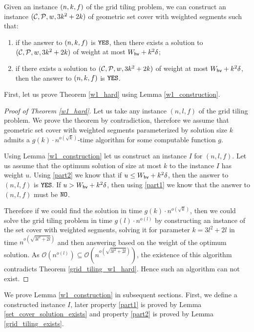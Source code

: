 \begin{lemma}
\label{w1_construction}
Given an instance $(n,k,f)$ of the grid tiling problem,
we can construct an instance $(\mathcal{C}, \mathcal{P}, w, 3k^2+2k)$ of geometric set cover
with weighted segments such that:
\begin{enumerate}[label={(\arabic*)}]
\item \label{part1} if the answer to $(n,k,f)$ is $\texttt{YES}$, then there exists a solution
to $(\mathcal{C}, \mathcal{P}, w, 3k^2+2k)$ of weight at most $W_{\mathsf{hv}}+k^2\delta$;
\item \label{part2} if there exists a solution to $(\mathcal{C}, \mathcal{P}, w, 3k^2+2k)$ of weight at most $W_{\mathsf{hv}}+k^2\delta$,
then the answer to $(n,k,f)$ is $\texttt{YES}$.
\end{enumerate}
\end{lemma}


First, let us prove Theorem \ref{w1_hard} using Lemma \ref{w1_construction}.

\begin{proof}[Proof of Theorem \ref{w1_hard}]
Let us take any instance $(n,l,f)$ of the grid tiling problem.
We prove the theorem by contradiction, therefore we assume
that geometric set cover with weighted segments
parameterized by solution size $k$ admits a
$g(k)\cdot n^{o(\sqrt{k})}$-time algorithm for some computable function $g$.

Using Lemma \ref{w1_construction} let us construct an instance $I$
for $(n,l,f)$.
Let us assume that the optimum solution of size at most $k$
to the instance $I$ has weight $u$.
Using \ref{part2} we know that if $u \le W_{\mathsf{hv}}+k^2\delta$,
then the answer to $(n,l,f)$ is $\texttt{YES}$.
If $u > W_{\mathsf{hv}}+k^2\delta$, then using \ref{part1}
we know that the answer to $(n,l,f)$ must be $\texttt{NO}$.

Therefore if we could find the solution in time $g(k) \cdot n^{o(\sqrt{k})}$,
then we could solve the grid tiling problem
in time $g(l)\cdot n^{o(l)}$ by constructing an instance of the set cover with
weighted segments, solving it 
for parameter $k = 3l^2+2l$ in time $n^{o(\sqrt{3l^2+2l})}$
and then answering based on the weight
of the optimum solution.
As $\mathcal{O}(n^{o(l)}) \subseteq \mathcal{O}(n^{o(\sqrt{3l^2+2l})})$,
the existence of this algorithm contradicts Theorem
\ref{grid_tiling_w1_hard}.
Hence such an algorithm can not exist.
\end{proof}

We prove Lemma \ref{w1_construction} in subsequent sections.
First, we define a constructed instance $I$, later property
\ref{part1} is proved by Lemma \ref{set_cover_solution_exists}
and property \ref{part2} is proved by Lemma \ref{grid_tiling_exists}.

